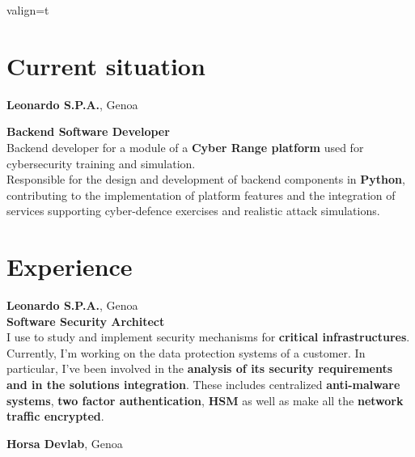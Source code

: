 \documentclass[a4paper,10pt]{article}
\begin{document}
\begin{adjustbox}{valign=t}
\begin{minipage}{0.6\textwidth} %
\section*{Current situation}
\begin{description}
\raggedright

\item[\normalfont \textcolor{ColorOne}{Sep. 2023}] \textbf{Leonardo S.P.A.}, Genoa\\ \medskip

\textbf{Backend Software Developer}\\

Backend developer for a module of a \textbf{Cyber Range platform} used for cybersecurity training and simulation. \\
Responsible for the design and development of backend components in \textbf{Python}, contributing to the implementation of platform features and the integration of services supporting cyber-defence exercises and realistic attack simulations.

\end{description}

\section*{Experience}
\begin{description}
\raggedright
\item[\normalfont \textcolor{ColorOne}{Sep. 2021 -- Sep. 2023}] \textbf{Leonardo S.P.A.}, Genoa\\ \medskip
\textbf{Software Security Architect}\\

I use to study and implement security mechanisms for \textbf{critical infrastructures}.\\
Currently, I'm working on the data protection systems of a customer. In particular, I've been involved in the \textbf{analysis of its security requirements and in the solutions integration}. These includes centralized \textbf{anti-malware systems}, \textbf{two factor authentication}, \textbf{HSM} as well as make all the \textbf{network traffic encrypted}.\\
\end{description}

\begin{description}
\raggedright
\item[\normalfont \textcolor{ColorOne}{Sep. 2018 -- Sep. 2021.}] 
	\textbf{Horsa Devlab}, Genoa\\ \medskip
	

\end{description}
\end{minipage}
\end{adjustbox}
\end{document}
